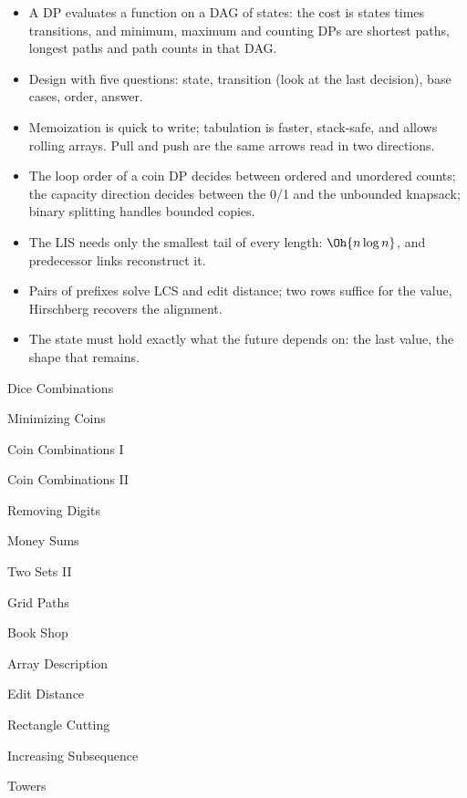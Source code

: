 \begin{summary}
\begin{itemize}
  \item A DP evaluates a function on a DAG of states: the cost is states times transitions, and minimum, maximum and counting DPs
        are shortest paths, longest paths and path counts in that DAG.
  \item Design with five questions: state, transition (look at the last decision), base cases, order, answer.
  \item Memoization is quick to write; tabulation is faster, stack-safe, and allows rolling arrays. Pull and push are the same
        arrows read in two directions.
  \item The loop order of a coin DP decides between ordered and unordered counts; the capacity direction decides between the 0/1
        and the unbounded knapsack; binary splitting handles bounded copies.
  \item The LIS needs only the smallest tail of every length: $\Oh{n \log n}$, and predecessor links reconstruct it.
  \item Pairs of prefixes solve LCS and edit distance; two rows suffice for the value, Hirschberg recovers the alignment.
  \item The state must hold exactly what the future depends on: the last value, the shape that remains.
\end{itemize}
\end{summary}

\begin{practice}
\begin{pplist}
  \item Dice Combinations
  \item Minimizing Coins
  \item Coin Combinations I
  \item Coin Combinations II
  \item Removing Digits
  \item Money Sums
  \item Two Sets II
\end{pplist}
\begin{pplist}
  \item Grid Paths
  \item Book Shop
  \item Array Description
  \item Edit Distance
  \item Rectangle Cutting
  \item Increasing Subsequence
  \item Towers
\end{pplist}
\end{practice}
